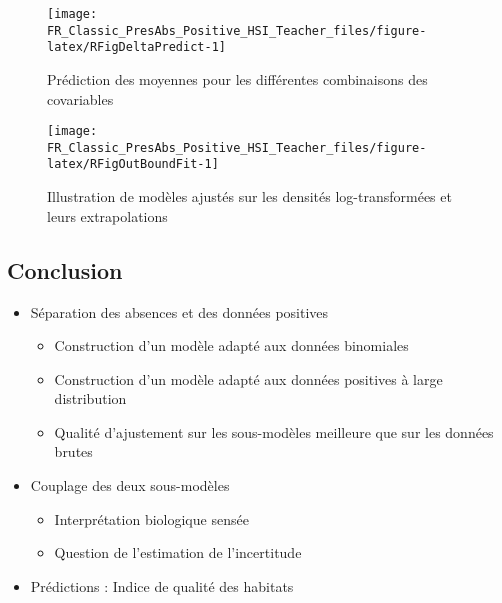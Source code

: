 \documentclass[french,a4paper]{article}
\providecommand{\tightlist}{%
  \setlength{\itemsep}{0pt}\setlength{\parskip}{0pt}}
\begin{document}
\begin{figure}[!h]

{\centering \texttt{[image: FR\_Classic\_PresAbs\_Positive\_HSI\_Teacher\_files/figure-latex/RFigDeltaPredict-1]} 

}

\caption{Prédiction des moyennes pour les différentes combinaisons des covariables}\label{fig:RFigDeltaPredict}
\end{figure}

\begin{figure}[!h]

{\centering \texttt{[image: FR\_Classic\_PresAbs\_Positive\_HSI\_Teacher\_files/figure-latex/RFigOutBoundFit-1]} 

}

\caption{Illustration de modèles ajustés sur les densités log-transformées et leurs extrapolations}\label{fig:RFigOutBoundFit}
\end{figure}

\hypertarget{conclusion}{%
\subsection{Conclusion}\label{conclusion}}

\begin{itemize}
\tightlist
\item
  Séparation des absences et des données positives

  \begin{itemize}
  \tightlist
  \item
    Construction d'un modèle adapté aux données binomiales
  \item
    Construction d'un modèle adapté aux données positives à large distribution
  \item
    Qualité d'ajustement sur les sous-modèles meilleure que sur les données brutes
  \end{itemize}
\item
  Couplage des deux sous-modèles

  \begin{itemize}
  \tightlist
  \item
    Interprétation biologique sensée
  \item
    Question de l'estimation de l'incertitude
  \end{itemize}
\item
  Prédictions : Indice de qualité des habitats
\end{itemize}
\end{document}
